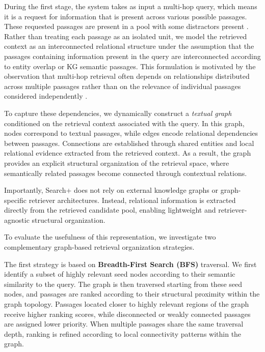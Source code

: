 \documentclass[11pt]{article}
\begin{document}
During the first stage, the system takes as input a multi-hop query, which means it is a request for information that is present across various possible passages.  These requested passages are present in a pool with some distractors present . Rather than treating each passage as an isolated unit, we model the retrieved context as an interconnected relational structure under the assumption that the passages containing information present in the query are interconnected according to entity overlap or KG semantic passages. This formulation is motivated by the observation that multi-hop retrieval often depends on relationships distributed across multiple passages rather than on the relevance of individual passages considered independently \cite{DBLP:journals/information/MongioviG24,DBLP:conf/emnlp/MinLCTH21}.

To capture these dependencies, we dynamically construct a \emph{textual graph} conditioned on the retrieval context associated with the query. In this graph, nodes correspond to textual passages, while edges encode relational dependencies between passages. Connections are established through shared entities and local relational evidence extracted from the retrieved context. As a result, the graph provides an explicit structural organization of the retrieval space, where semantically related passages become connected through contextual relations.

Importantly, Search+ does not rely on external knowledge graphs or graph-specific retriever architectures. Instead, relational information is extracted directly from the retrieved candidate pool, enabling lightweight and retriever-agnostic structural organization.

To evaluate the usefulness of this representation, we investigate two complementary graph-based retrieval organization strategies.

The first strategy is based on \textbf{Breadth-First Search (BFS)} traversal. We first identify a subset of highly relevant seed nodes according to their semantic similarity to the query. The graph is then traversed starting from these seed nodes, and passages are ranked according to their structural proximity within the graph topology. Passages located closer to highly relevant regions of the graph receive higher ranking scores, while disconnected or weakly connected passages are assigned lower priority. When multiple passages share the same traversal depth, ranking is refined according to local connectivity patterns within the graph.
\end{document}

